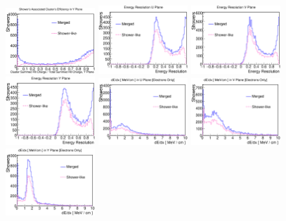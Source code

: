 \begin{figure}[htbp]
\begin{center}
\includegraphics[width=0.3\textwidth]{figs/ongoing/eminus/ClusterEffY.eps}
\includegraphics[width=0.3\textwidth]{figs/ongoing/eminus/EnergyResU.eps}
\includegraphics[width=0.3\textwidth]{figs/ongoing/eminus/EnergyResV.eps}
\includegraphics[width=0.3\textwidth]{figs/ongoing/eminus/EnergyResY.eps}
\includegraphics[width=0.3\textwidth]{figs/ongoing/eminus/dEdxU.eps}
\includegraphics[width=0.3\textwidth]{figs/ongoing/eminus/dEdxV.eps}
\includegraphics[width=0.3\textwidth]{figs/ongoing/eminus/dEdxY.eps}

\end{center}
\end{figure}
